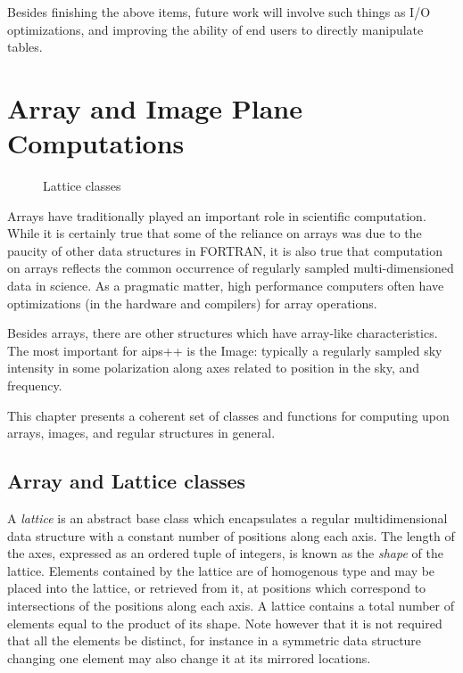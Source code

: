 Besides finishing the above items, future work will involve such
things as I/O optimizations, and improving the ability of end users to
directly manipulate tables.

\section{Array and Image Plane Computations}
\label{sec:Image}

\begin{figure}
\epsfverbosetrue
\epsfysize=6.0in
\caption{Lattice classes}
\label{fig:LatticeClasses}
\end{figure}

Arrays have traditionally played an important role in scientific
computation. While it is certainly true that some of the reliance on
arrays was due to the paucity of other data structures in FORTRAN, it
is also true that computation on arrays reflects the common occurrence
of regularly sampled multi-dimensioned data in science. As a pragmatic
matter, high performance computers often have optimizations (in the
hardware and compilers) for array operations.

Besides arrays, there are other structures which have array-like
characteristics. The most important for {\sc aips++} is the Image:
typically a regularly sampled sky intensity in some polarization along
axes related to position in the sky, and frequency.

This chapter presents a coherent set of classes and functions for
computing upon arrays, images, and regular structures in general.
\subsection{Array and Lattice classes}
\label{sec:ArrayLattice}

A {\em lattice} is an abstract base class which encapsulates a regular
multidimensional data structure with a constant number of positions
along each axis. The length of the axes, expressed as an ordered tuple
of integers, is known as the {\em shape} of the lattice.  Elements
contained by the lattice are of homogenous type and may be placed into
the lattice, or retrieved from it, at positions which correspond to
intersections of the positions along each axis. A lattice contains a
total number of elements equal to the product of its shape. Note
however that it is not required that all the elements be distinct, for
instance in a symmetric data structure changing one element may also
change it at its mirrored locations.

